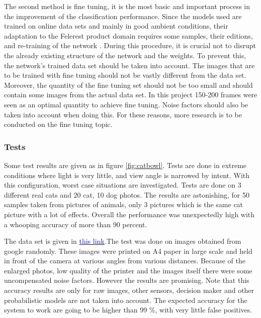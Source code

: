 The second method is fine tuning, it is the most basic and important process in the improvement of the classification performance. Since the models used are trained on online data sets and mainly in good ambient conditions, their adaptation to the Felerest product domain requires some samples, their editions, and re-training of the network \cite{cite:cnnFineTune1}. During this procedure, it is crucial not to disrupt the already existing structure of the network and the weights. To prevent this, the network's trained data set should be taken into account. The images that are to be trained with fine tuning should not be vastly different from the data set. Moreover, the quantity of the fine tuning set should not be too small and should contain some images from the actual data set. In this project 150-200 frames were seen as an optimal quantity to achieve fine tuning. Noise factors should also be taken into account when doing this. For these reasons, more research is to be conducted on the fine tuning topic. 



\subsubsection{Tests}

Some test results are given as in figure \ref{fig:catbowl}. Tests are done in extreme conditions where light is very little, and view angle is narrowed by intent. With this configuration, worst case situations are investigated. Tests are done on 3 different real cats and 20 cat, 10 dog photos. The results are astonishing, for 50 samples taken from pictures of animals, only 3 pictures which is the same cat picture with a lot of effects. Overall the performance was unexpectedly high with a whooping accuracy of more than 90 percent. 

The data set is given in \href{http://dosya.afeserpi.duckdns.org:8080/dataset}{\textcolor{blue}{this link}}.The test was done on images obtained from google randomly. These images were printed on A4 paper in large scale and held in front of the camera at various angles from various distances. Because of the enlarged photos, low quality of the printer and the images itself there were some uncompensated noise factors. However the results are promising. Note that this accuracy results are only for raw images, other sensors, decision maker and other probabilistic models are not taken into account. The expected accuracy for the system to work are going to be higher than 99 \%, with very little false positives. 

